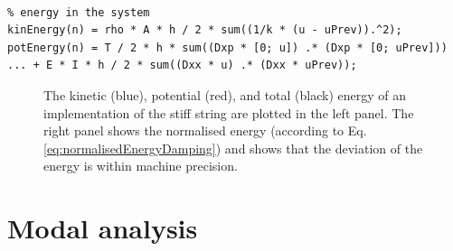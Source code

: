 {\begin{minipage}{\textwidth}
\begin{lstlisting}[caption=Calculating $\h$ for the simply supported boundary condition., label=alg:stiffStringEnergy]
%%%% In the main loop: %%%%

% energy in the system
kinEnergy(n) = rho * A * h / 2 * sum((1/k * (u - uPrev)).^2);
potEnergy(n) = T / 2 * h * sum((Dxp * [0; u]) .* (Dxp * [0; uPrev])) ... + E * I * h / 2 * sum((Dxx * u) .* (Dxx * uPrev));
\end{lstlisting}
\end{minipage}

\begin{figure}[h]
    \centering
      \caption{The kinetic (blue), potential (red), and total (black) energy of an implementation of the stiff string are plotted in the left panel. The right panel shows the normalised energy (according to Eq. \eqref{eq:normalisedEnergyDamping}) and shows that the deviation of the energy is within machine precision. \label{fig:energyStiffString}}
\end{figure}

\section{Modal analysis}

}
